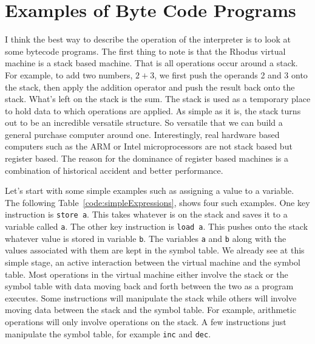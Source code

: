 \section{Examples of Byte Code Programs}

I think the best way to describe the operation of the interpreter is to look at some bytecode programs. The first thing to note is that the Rhodus virtual machine is a stack based machine. That is all operations occur around a stack. For example, to add two numbers, $2 + 3$, we first push the operands 2 and 3 onto the stack, then apply the addition operator and push the result back onto the stack. What's left on the stack is the sum. The stack is used as a temporary place to hold data to which operations are applied. As simple as it is, the stack turns out to be an incredible versatile structure. So versatile that we can build a general purchase computer around one. Interestingly, real hardware based computers such as the ARM or Intel microprocessors are not stack based but register based. The reason for the dominance of register based machines is a combination of historical accident and better performance.

Let's start with some simple examples such as assigning a value to a variable. The following Table~\ref{code:simpleExpressions}, shows four such examples. One key instruction is {\tt store a}. This takes whatever is on the stack and saves it to a variable called {\tt a}. The other key instruction is {\tt load a}. This pushes onto the stack whatever value is stored in variable {\tt b}. The variables {\tt a} and {\tt b} along with the values associated with them are kept in the symbol table. We already see at this simple stage, an active interaction between the virtual machine and the symbol table. Most operations in the virtual machine either involve the stack or the symbol table with data moving back and forth between the two as a program executes. Some instructions will manipulate the stack while others will involve moving data between the stack and the symbol table. For example, arithmetic operations will only involve operations on the stack. A few instructions just manipulate the symbol table, for example {\tt inc} and {\tt dec}.

